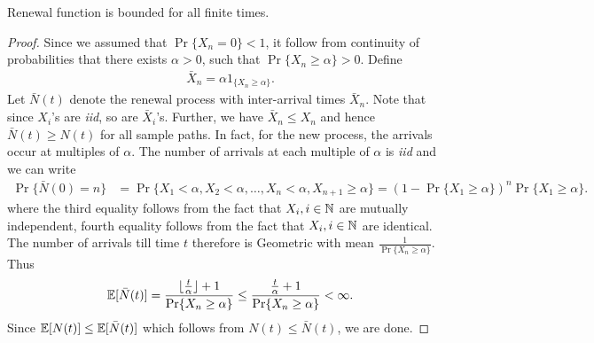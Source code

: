 \documentclass[a4paper,10pt, english]{article}
\begin{document}
\begin{prop} Renewal function is bounded for all finite times.
\end{prop}
\begin{proof}
Since we assumed that $\Pr\{X_n = 0\} < 1$, it follow from continuity of probabilities that there exists $\alpha > 0$, such that $\Pr\{X_n \geq \alpha\} >0$. Define
\begin{align*}
\bar{X}_n = \alpha 1_{\{X_n \geq \alpha\}}.
\end{align*}
Let $\bar{N}(t)$ denote the renewal process with inter-arrival times $\bar{X}_n$. 
Note that since $X_i$'s are \emph{iid}, so are $\bar{X}_i$'s. %
Further, we have $\bar{X}_n \leq X_n$ and hence $\bar{N}(t) \geq N(t)$ for all sample paths. 
In fact, for the new process, the arrivals occur at multiples of $\alpha$. 
The number of arrivals at each multiple of $\alpha$ is \emph{iid} and we can write 
\begin{align*}
\Pr\{\bar{N}(0) = n\} %
&= \Pr\{X_1 < \alpha,X_2 < \alpha,\ldots,X_n < \alpha,X_{n+1} \geq \alpha\}
= \left(1- \Pr\{X_1 \geq \alpha \}\right) ^{n} \Pr\{X_1 \geq \alpha\}.
\end{align*}
where the third equality follows from the fact that $ X_i, i \in \mathbb{N}$ are mutually independent, fourth equality follows from the fact that $ X_i, i \in \mathbb{N}$ are identical.
	\\
	The number of arrivals till time $t$ therefore is Geometric with mean $\frac{1}{\Pr\{X_n \geq \alpha\}}$. Thus 
	\begin{align*}
	\mathbb{E}[\bar{N}(t)] = \frac{\lfloor\frac{t}{\alpha} \rfloor + 1}{\Pr\{X_n \geq \alpha\}} \leq \frac{\frac{t}{\alpha} + 1}{\Pr\{X_n \geq \alpha\}} < \infty.
	\end{align*}
	Since $\mathbb{E}[N(t)] \leq \mathbb{E}[\bar{N}(t)]$ which follows from $N(t) \leq \bar{N}(t)$, we are done.
\end{proof} 
\end{document}
